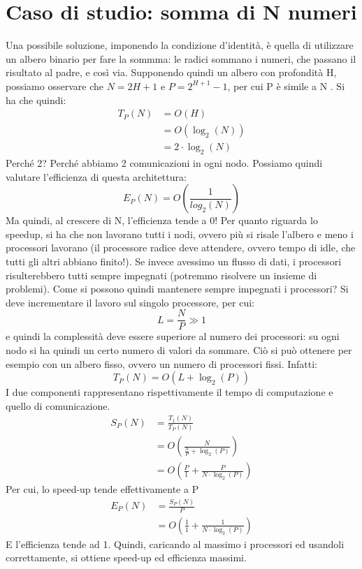 \section{Caso di studio: somma di N numeri}
Una possibile soluzione, imponendo la condizione d'identità, è quella di utilizzare un albero binario per fare la
sommma: le radici sommano i numeri, che passano il risultato al padre, e così via. Supponendo quindi un albero con
profondità H, possiamo osservare che $N = 2{H+1}$ e $P = 2^{H+1} - 1$, per cui P è simile a N . Si ha che quindi:
\begin{align}
T_P(N) &= O \left(H \right)              \nonumber \\
       &= O \left(\log_2(N)\right)      \nonumber \\
       &= 2 \cdot \log_2 \left(N\right)
\end{align}
Perché 2? Perché abbiamo 2 comunicazioni in ogni nodo. Possiamo quindi valutare l'efficienza di questa architettura:
\begin{equation}
 E_P \left( N \right) = O \left( \frac{1}{log_2\left(N\right)} \right)
\end{equation}
Ma quindi, al crescere di N, l'efficienza tende a 0! Per quanto riguarda lo speedup, si ha che non lavorano tutti i
nodi, ovvero più si risale l'albero e meno i processori lavorano (il processore radice deve attendere, ovvero tempo
di idle, che tutti gli altri abbiano finito!). Se invece avessimo un flusso di dati, i processori risulterebbero
tutti sempre impegnati (potremmo risolvere un insieme di problemi).
Come si possono quindi mantenere sempre impegnati i processori? Si deve incrementare il lavoro sul singolo processore,
per cui:
\begin{equation}
 L = \frac{N}{P} \gg 1
\end{equation}
e quindi la complessità deve essere superiore al numero dei processori: su ogni nodo si ha quindi un certo numero di
valori da sommare. Ciò si può ottenere per esempio con un albero fisso, ovvero un numero di processori fissi. Infatti:
\begin{equation}
 T_P\left(N\right) = O \left(L + \log_2 \left(P\right)\right)
\end{equation}
I due componenti rappresentano rispettivamente il tempo di computazione e quello di comunicazione.
\begin{align}
 S_P(N) &= \frac{T_1(N)}{T_P(N)} \nonumber \\
        &= O \left( \frac{N}{\frac{N}{P} + \log_2(P)} \right) \nonumber \\
        &= O \left( \frac{P}{1} + \frac{P}{N \cdot \log_2(P)} \right)
\end{align}
Per cui, lo speed-up tende effettivamente a P
\begin{align}
 E_P(N) &= \frac{S_P(N)}{P} \nonumber \\
        &= O \left(\frac{1}{1} + \frac{1}{N \cdot \log_2(P)}\right)
\end{align}
E l'efficienza tende ad 1. Quindi, caricando al massimo i processori ed usandoli correttamente, si ottiene speed-up
ed efficienza massimi.
